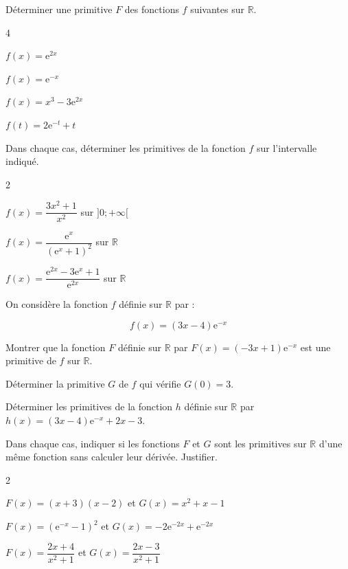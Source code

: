 \documentclass[11pt,a4paper]{article}  %
\begin{document}
\vspace*{-0.5cm}
\exerciceDS{}

Déterminer une primitive $F$ des fonctions $f$ suivantes sur $\mathbb{R}$.
\begin{multicols}{4}
	\begin{enumMet}
		\item $f(x)=\mathrm{e}^{2 x}$
		\item $f(x)=\mathrm{e}^{-x}$
		\item $f(x)=x^3-3 \mathrm{e}^{2 x}$
		\item $f(t)=2 \mathrm{e}^{-t}+t$
	\end{enumMet}
\end{multicols}

\vspace*{-0.5cm}
\exerciceDS{}

Dans chaque cas, déterminer les primitives de la fonction $f$ sur l'intervalle indiqué.
\begin{multicols}{2}
	\begin{enumMet}
	\item $f(x)=\dfrac{3 x^2+1}{x^2}$ sur $] 0 ;+\infty[$
	\item $f(x)=\dfrac{\mathrm{e}^x}{\left(\mathrm{e}^x+1\right)^2}$ sur $\mathbb{R}$
	\item $f(x)=\dfrac{\mathrm{e}^{2 x}-3 \mathrm{e}^x+1}{\mathrm{e}^{2 x}}$ sur $\mathbb{R}$
\end{enumMet}
\end{multicols}

\vspace*{-0.5cm}
\exerciceDS{}

On considère la fonction $f$ définie sur $\mathbb{R}$ par :

$$
f(x)=(3 x-4) \mathrm{e}^{-x}
$$

\begin{enumMet}
	\item Montrer que la fonction $F$ définie sur $\mathbb{R}$ par $F(x)=(-3 x+1) \mathrm{e}^{-x}$ est une primitive de $f$ sur $\mathbb{R}$.
	\item Déterminer la primitive $G$ de $f$ qui vérifie $G(0)=3$.
	\item Déterminer les primitives de la fonction $h$ définie sur $\mathbb{R}$ par $h(x)=(3 x-4) \mathrm{e}^{-x}+2 x-3$.
\end{enumMet}

\vspace*{-0.5cm}
\exerciceDS{}

Dans chaque cas, indiquer si les fonctions $F$ et $G$ sont les primitives sur $\mathbb{R}$ d'une même fonction sans calculer leur dérivée. Justifier.
\begin{multicols}{2}
	\begin{enumMet}
	\item $F(x)=(x+3)(x-2)$ et $G(x)=x^2+x-1$
	\item $F(x)=\left(\mathrm{e}^{-x}-1\right)^2$ et $G(x)=-2 \mathrm{e}^{-2 x}+\mathrm{e}^{-2 x}$
	\item $F(x)=\dfrac{2 x+4}{x^2+1}$ et $G(x)=\dfrac{2 x-3}{x^2+1}$
\end{enumMet}
\end{multicols}
\end{document}
